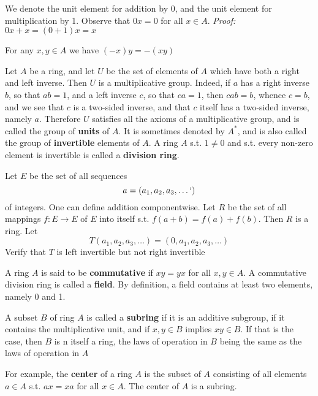 \documentclass[11pt]{article}
\begin{document}
We denote the unit element for addition by 0, and the unit element for multiplication by 1.
Observe that \(0x=0\) for all \(x\in A\). \emph{Proof:} \(0x+x=(0+1)x=x\)

For any \(x,y\in A\) we have \((-x)y=-(xy)\)

Let \(A\) be a ring, and let \(U\) be the set of elements of \(A\) which have both a right and
left inverse. Then \(U\) is a multiplicative group. Indeed, if \(a\) has a right inverse \(b\),
so that \(ab=1\), and a left inverse \(c\), so that \(ca=1\), then \(cab=b\), whence \(c=b\), and
we see that \(c\) is a two-sided inverse, and that \(c\) itself has a two-sided inverse,
namely \(a\). Therefore \(U\) satisfies all the axioms of a multiplicative group, and is called
the group of \textbf{units} of \(A\). It is sometimes denoted by \(A^*\), and is also called the group of
\textbf{invertible} elements of \(A\). A ring \(A\) s.t. \(1\neq 0\) and s.t. every non-zero element is
invertible is called a \textbf{division ring}.

\begin{examplle}
Let \(E\) be the set of all sequences
\begin{equation*}
a=(a_1,a_2,a_3,\dots`)
\end{equation*}
of integers. One can define addition componentwise. Let \(R\) be the set of all
mappings \(f:E\to E\) of \(E\) into itself s.t. \(f(a+b)=f(a)+f(b)\). Then \(R\) is a ring. Let
\begin{equation*}
T(a_1,a_2,a_3,\dots)=(0,a_1,a_2,a_3,\dots)
\end{equation*}
Verify that \(T\) is left invertible but not right invertible
\end{examplle}

A ring \(A\) is said to be \textbf{commutative} if \(xy=yx\) for all \(x,y\in A\). A commutative division
ring is called a \textbf{field}. By definition, a field contains at least two elements, namely 0 and 1.

   A subset \(B\) of ring \(A\) is called a \textbf{subring} if it is an additive subgroup, if it contains
   the multiplicative unit, and if \(x,y\in B\) implies \(xy\in B\). If that is the case, then \(B\) is
n   itself a ring, the laws of operation in \(B\) being the same as the laws of operation in \(A\)

For example, the \textbf{center} of a ring \(A\) is the subset of \(A\) consisting of all
elements \(a\in A\) s.t. \(ax=xa\) for all \(x\in A\). The center of \(A\) is a subring.
\end{document}
